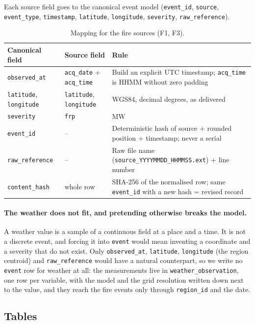 \documentclass[11pt,a4paper]{article}
\newcommand{\code}[1]{\texttt{\small #1}}
\begin{document}
Each source field goes to the canonical event model
(\code{event\_id}, \code{source}, \code{event\_type}, \code{timestamp}, \code{latitude},
\code{longitude}, \code{severity}, \code{raw\_reference}).

\begin{table}[h]
\centering
\small
\begin{tabular}{L{3.6cm}L{4.4cm}L{6.8cm}}
\toprule
\textbf{Canonical field} & \textbf{Source field} & \textbf{Rule} \\
\midrule
\code{observed\_at} & \code{acq\_date} + \code{acq\_time} & Build an explicit UTC timestamp; \code{acq\_time} is HHMM without zero padding \\
\code{latitude}, \code{longitude} & \code{latitude}, \code{longitude} & WGS84, decimal degrees, as delivered \\
\code{severity} & \code{frp} & MW \\
\code{event\_id} & -- & Deterministic hash of source + rounded position + timestamp; never a serial \\
\code{raw\_reference} & -- & Raw file name (\code{source\_YYYYMMDD\_HHMMSS.ext}) + line number \\
\code{content\_hash} & whole row & SHA-256 of the normalised row; same \code{event\_id} with a new hash = revised record \\
\bottomrule
\end{tabular}
\caption{Mapping for the fire sources (F1, F3).}
\end{table}

\paragraph{The weather does not fit, and pretending otherwise breaks the model.} A weather value is a
sample of a continuous field at a place and a time. It is not a discrete event, and forcing it into
\code{event} would mean inventing a coordinate and a severity that do not exist. Only
\code{observed\_at}, \code{latitude}, \code{longitude} (the region centroid) and
\code{raw\_reference} would have a natural counterpart, so we write no \code{event} row for weather at
all: the measurements live in \code{weather\_observation}, one row per variable, with the model and
the grid resolution written down next to the value, and they reach the fire events only through
\code{region\_id} and the date.

\subsection{Tables}
\end{document}

